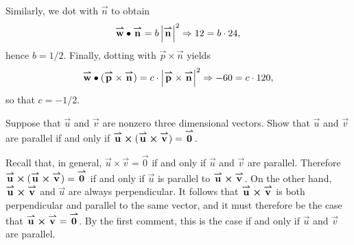 \documentclass[]{ximera}
\begin{document}
\begin{problem}
\begin{solution}
Similarly, we dot with $\vec{n}$ to obtain
$$
\vec{w} \dotp \vec{n} = b \left|\vec{n}\right|^2 \Rightarrow 12 = b \cdot 24,
$$
hence $b = 1/2$. Finally, dotting with $\vec{p} \times \vec{n}$ yields
$$
\vec{w} \dotp (\vec{p} \times \vec{n}) = c \cdot \left|\vec{p} \times \vec{n} \right|^2 \Rightarrow -60 = c \cdot 120,
$$
so that $c = -1/2$. 
\end{solution}
\end{problem}

\begin{problem}
Suppose that $\vec{u}$ and $\vec{v}$ are nonzero three dimensional vectors.  Show that $\vec{u}$ and $\vec{v}$ are parallel if and only if $\vec{u} \cross (\vec{u} \cross \vec{v}) = \vec{0}$. 

\begin{solution}
Recall that, in general, $\vec{u} \times \vec{v} = \vec{0}$ if and only if $\vec{u}$ and $\vec{v}$ are parallel. Therefore $\vec{u} \cross (\vec{u} \cross \vec{v}) = \vec{0}$ if and only if $\vec{u}$ is parallel to $\vec{u} \cross \vec{v}$. On the other hand, $\vec{u} \cross \vec{v}$ and $\vec{u}$ are always perpendicular. It follows that $\vec{u} \cross \vec{v}$ is both perpendicular and parallel to the same vector, and it must therefore be the case that $\vec{u} \cross \vec{v} = \vec{0}$. By the first comment, this is the case if and only if $\vec{u}$ and $\vec{v}$ are parallel. 
\end{solution}
\end{problem}
\end{document}
